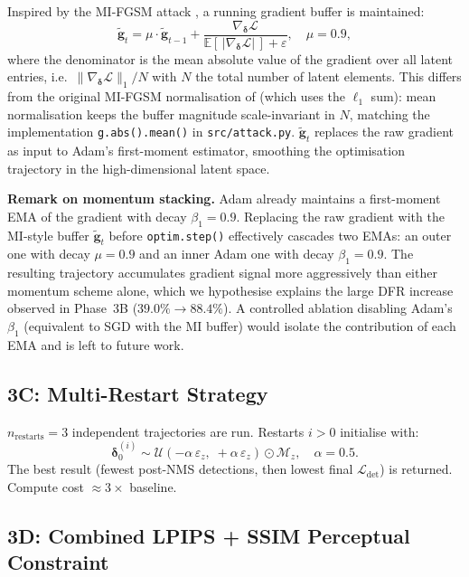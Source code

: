\documentclass[12pt,a4paper]{report}
\newcommand{\Ldet}{\mathcal{L}_{\text{det}}}
\begin{document}
Inspired by the MI-FGSM attack \cite{dong2018boosting}, a running gradient buffer is maintained:
\begin{equation}
  \tilde{\mathbf{g}}_t = \mu \cdot \tilde{\mathbf{g}}_{t-1}
    + \frac{\nabla_{\bm{\delta}} \mathcal{L}}
           {\mathbb{E}\!\left[\,|\nabla_{\bm{\delta}} \mathcal{L}|\,\right] + \varepsilon},
  \quad \mu = 0.9,
\end{equation}
where the denominator is the mean absolute value of the gradient over all
latent entries, i.e.\ $\|\nabla_{\bm{\delta}} \mathcal{L}\|_1 / N$ with
$N$ the total number of latent elements. This differs from the original
MI-FGSM normalisation of \cite{dong2018boosting} (which uses the $\ell_1$
sum): mean normalisation keeps the buffer magnitude scale-invariant in $N$,
matching the implementation \texttt{g.abs().mean()} in \texttt{src/attack.py}.
$\tilde{\mathbf{g}}_t$ replaces the raw gradient as input to Adam's first-moment
estimator, smoothing the optimisation trajectory in the high-dimensional latent space.

\noindent\textbf{Remark on momentum stacking.}
Adam already maintains a first-moment EMA of the gradient with decay $\beta_1 = 0.9$.
Replacing the raw gradient with the MI-style buffer $\tilde{\mathbf{g}}_t$ before
\texttt{optim.step()} effectively cascades two EMAs: an outer one with decay
$\mu = 0.9$ and an inner Adam one with decay $\beta_1 = 0.9$. The resulting
trajectory accumulates gradient signal more aggressively than either momentum
scheme alone, which we hypothesise explains the large DFR increase observed
in Phase~3B ($39.0\% \to 88.4\%$). A controlled ablation disabling Adam's
$\beta_1$ (equivalent to SGD with the MI buffer) would isolate the
contribution of each EMA and is left to future work.

\subsection{3C: Multi-Restart Strategy}
\label{sec:3c}

$n_{\text{restarts}} = 3$ independent trajectories are run. Restarts $i > 0$ initialise with:
\begin{equation}
  \bm{\delta}_0^{(i)} \sim \mathcal{U}(-\alpha\,\varepsilon_z,\; +\alpha\,\varepsilon_z) \odot \mathcal{M}_z, \quad \alpha = 0.5.
\end{equation}
The best result (fewest post-NMS detections, then lowest final $\Ldet$) is returned.
Compute cost $\approx 3\times$ baseline.

\subsection{3D: Combined LPIPS + SSIM Perceptual Constraint}
\label{sec:3d}
\end{document}
